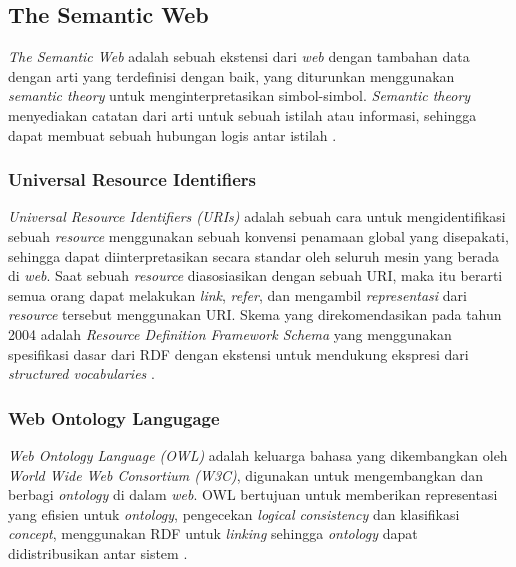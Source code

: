 \subsection{The Semantic Web}
\label{subsec:the-semantic-web}

\textit{The Semantic Web} adalah sebuah ekstensi dari \textit{web} dengan tambahan data dengan arti yang terdefinisi dengan baik, yang diturunkan menggunakan \textit{semantic theory} untuk menginterpretasikan simbol-simbol. \textit{Semantic theory} menyediakan catatan dari arti untuk sebuah istilah atau informasi, sehingga dapat membuat sebuah hubungan logis antar istilah \parencite{shadbolt2006semantic}.

\subsubsection{Universal Resource Identifiers}
\label{subsubsec:universal-resource-identifiers}

\textit{Universal Resource Identifiers (URIs)} adalah sebuah cara untuk mengidentifikasi sebuah \textit{resource} menggunakan sebuah konvensi penamaan global yang disepakati, sehingga dapat diinterpretasikan secara standar oleh seluruh mesin yang berada di \textit{web}. Saat sebuah \textit{resource} diasosiasikan dengan sebuah URI, maka itu berarti semua orang dapat melakukan \textit{link}, \textit{refer}, dan mengambil \textit{representasi} dari \textit{resource} tersebut menggunakan URI. Skema yang direkomendasikan pada tahun 2004 adalah \textit{Resource Definition Framework Schema} yang menggunakan spesifikasi dasar dari RDF dengan ekstensi untuk mendukung ekspresi dari \textit{structured vocabularies} \parencite{shadbolt2006semantic}.

\subsubsection{Web Ontology Langugage}
\label{subsubsec:web-ontology-language}

\textit{Web Ontology Language (OWL)} adalah keluarga bahasa yang dikembangkan oleh \textit{World Wide Web Consortium (W3C)}, digunakan untuk mengembangkan dan berbagi \textit{ontology} di dalam \textit{web}. OWL bertujuan untuk memberikan representasi yang efisien untuk \textit{ontology}, pengecekan \textit{logical consistency} dan klasifikasi \textit{concept}, menggunakan RDF untuk \textit{linking} sehingga \textit{ontology} dapat didistribusikan antar sistem \parencite{shadbolt2006semantic}.
